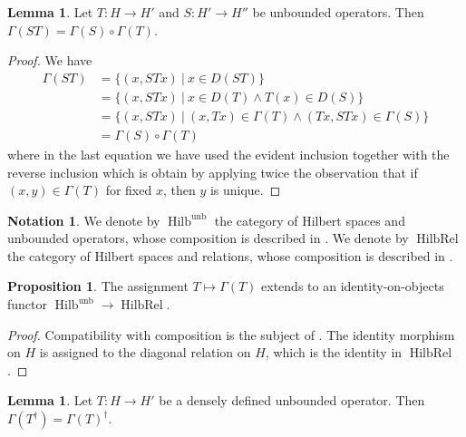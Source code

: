 \documentclass{article}
\newcommand{\Hilb}{\operatorname{Hilb}}%
\newcommand{\unb}{\operatorname{unb}}%
\newcommand{\HilbRel}{\operatorname{HilbRel}}%
\numberwithin{equation}{section}
\theoremstyle{definition}
\newtheorem{lemma}[definition]{Lemma}
\newtheorem{proposition}[definition]{Proposition}
\newtheorem{notation}[definition]{Notation}
\theoremstyle{theorem}
\begin{document}
\begin{lemma}\label{Lemma: the graph is compatible with composition}
    Let $T \colon H \to H'$ and $S \colon H' \to H''$ be unbounded operators. Then $\Gamma(ST) = \Gamma(S) \circ \Gamma(T)$.
\end{lemma}
\begin{proof}
    We have 
    \begin{align*}
        \Gamma(ST) &= \{ (x,STx) \ | \ x \in D(ST) \} \\
        &= \{ (x,STx) \ | \ x \in D(T) \land T(x) \in D(S) \} \\
        &= \{ (x,STx) \ | \ (x,Tx) \in \Gamma(T) \land (Tx,STx) \in \Gamma(S) \} \\
        &= \Gamma(S) \circ \Gamma(T)
    \end{align*}
    where in the last equation we have used the evident inclusion together with the reverse inclusion which is obtain by applying twice the observation 
    that if $(x,y) \in \Gamma(T)$ for fixed $x$, then $y$ is unique. 
\end{proof}
\begin{notation}
    We denote by $\Hilb^{\unb}$ the category of Hilbert spaces and unbounded operators, whose composition is described in 
    . We denote by $\HilbRel$ the category of Hilbert spaces and relations, whose composition is 
    described in .
\end{notation}
\begin{proposition}
    The assignment $T \mapsto \Gamma(T)$ extends to an identity-on-objects functor $\Hilb^{\unb} \to \HilbRel$. 
\end{proposition}
\begin{proof}
    Compatibility with composition is the subject of . The identity morphism on $H$ 
    is assigned to the diagonal relation on $H$, which is the identity in $\HilbRel$.
\end{proof}
\begin{lemma}\label{Lemma: the graph is compatible with the adjoint}
    Let $T \colon H \to H'$ be a densely defined unbounded operator. Then $\Gamma(T^\dagger) = \Gamma(T)^\dagger$. 
\end{lemma}
\end{document}
